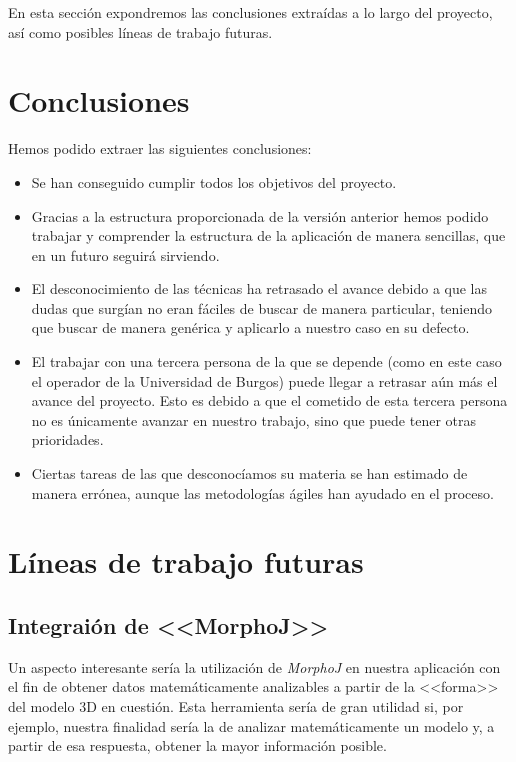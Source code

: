 En esta sección expondremos las conclusiones extraídas a lo largo del proyecto, así como posibles líneas de trabajo futuras.

\section{Conclusiones}
Hemos podido extraer las siguientes conclusiones:

\begin{itemize}
	\item Se han conseguido cumplir todos los objetivos del proyecto.
	\item Gracias a la estructura proporcionada de la versión anterior hemos podido trabajar y comprender la estructura de la aplicación de manera sencillas, que en un futuro seguirá sirviendo.
	\item El desconocimiento de las técnicas ha retrasado el avance debido a que las dudas que surgían no eran fáciles de buscar de manera particular, teniendo que buscar de manera genérica y aplicarlo a nuestro caso en su defecto.
	\item El trabajar con una tercera persona de la que se depende (como en este caso el operador de la Universidad de Burgos) puede llegar a retrasar aún más el avance del proyecto. Esto es debido a que el cometido de esta tercera persona no es únicamente avanzar en nuestro trabajo, sino que puede tener otras prioridades.
	\item Ciertas tareas de las que desconocíamos su materia se han estimado de manera errónea, aunque las metodologías ágiles han ayudado en el proceso.
\end{itemize}
\section{Líneas de trabajo futuras}

\subsection{Integraión de <<MorphoJ>>}
Un aspecto interesante sería la utilización de \textit{MorphoJ} en nuestra aplicación con el fin de obtener datos matemáticamente analizables a partir de la <<forma>> del modelo 3D en cuestión. Esta herramienta sería de gran utilidad si, por ejemplo, nuestra finalidad sería la de analizar matemáticamente un modelo y, a partir de esa respuesta, obtener la mayor información posible.

